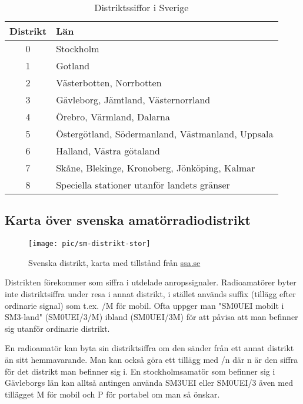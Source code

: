 \begin{table}[h]
	\centering
\begin{tabular}{cl}
	\textbf{Distrikt} & \textbf{Län}                                     \\ \hline %
	      0        & Stockholm                                        \\
	      1        & Gotland                                          \\
	      2        & Västerbotten, Norrbotten                         \\
	      3        & Gävleborg, Jämtland, Västernorrland              \\
	      4        & Örebro, Värmland, Dalarna                        \\
	      5        & Östergötland, Södermanland, Västmanland, Uppsala \\
	      6        & Halland, Västra götaland                         \\
	      7        & Skåne, Blekinge, Kronoberg, Jönköping, Kalmar    \\
	      8        & Speciella stationer utanför landets gränser
\end{tabular}
\caption{Distriktssiffor i Sverige}
\end{table}

\subsection{Karta över svenska amatörradiodistrikt}

\begin{figure}
	\centering
	\texttt{[image: pic/sm-distrikt-stor]}
	\label{fig:sm-distrikt}
	\caption{Svenska distrikt, karta med tillstånd från
          \href{https://SSA.SE}{ssa.se}}
\end{figure}

Distrikten förekommer som siffra i utdelade anropssignaler. Radioamatörer byter
inte distriktsiffra under resa i annat distrikt, i stället används suffix
(tillägg efter ordinarie signal) som t.ex. /M för mobil. Ofta uppger man "SM0UEI
mobilt i SM3-land" (SM0UEI/3/M) ibland (SM0UEI/3M) för att påvisa att man
befinner sig utanför ordinarie distrikt.

En radioamatör kan byta sin distriktsiffra om den sänder från ett annat distrikt
än sitt hemmavarande. Man kan också göra ett tillägg med /n där n är den siffra
för det distrikt man befinner sig i. En stockholmsamatör som befinner sig i
Gävleborgs län kan alltså antingen använda SM3UEI eller SM0UEI/3 även med
tillägget M för mobil och P för portabel om man så önskar.

